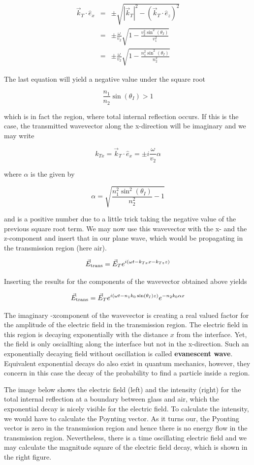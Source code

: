\documentclass[
  a4paper,
]{book}
\begin{document}
\begin{eqnarray}
\vec{k}_T\cdot \hat{e}_x&=&\pm \sqrt{|\vec{k}_T|^2-(\vec{k}_T\cdot \hat{e}_z)^2}\\
&=&\pm \frac{\omega}{v_2}\sqrt{1-\frac{v_2^2\sin^2(\theta_I)}{v_1^2}}\\
&=&\pm \frac{\omega}{v_2}\sqrt{1-\frac{n_1^2\sin^2(\theta_I)}{n_2^2}}
\end{eqnarray}

The last equation will yield a negative value under the square root

\[
\frac{n_1}{n_2}\sin(\theta_I)>1
\]

which is in fact the region, where total internal reflection occurs. If
this is the case, the transmitted wavevector along the x-direction will
be imaginary and we may write

\[
k_{Tx}=\vec{k}_T\cdot \hat{e}_x=\pm i \frac{\omega}{v_2}\alpha
\]

where \(\alpha\) is the given by

\[
\alpha=\sqrt{\frac{n_1^2\sin^2(\theta_I)}{n_2^2}-1}
\]

and is a positive number due to a little trick taking the negative value
of the previous square root term. We may now use this wavevector with
the x- and the z-component and insert that in our plane wave, which
would be propagating in the transmission region (here air).

\[
\vec{E}_{\rm trans}=\vec{E}_T e^{i(\omega t -k_{Tx}x-k_{Tz}z)}
\]

Inserting the results for the components of the wavevector obtained
above yields

\[
\vec{E}_{\rm trans}=\vec{E}_T e^{i(\omega t -n_1 k_0\sin(\theta_I) z)}e^{-n_2k_0 \alpha x}
\]

The imaginary -xcomponent of the wavevector is creating a real valued
factor for the amplitude of the electric field in the transmission
region. The electric field in this region is decaying exponentially with
the distance \(x\) from the interface. Yet, the field is only
osciallting along the interface but not in the x-direction. Such an
exponentially decaying field without oscillation is called
\textbf{evanescent wave}. Equivalent exponential decays do also exist in
quantum mechanics, however, they concern in this case the decay of the
probability to find a particle inside a region.

The image below shows the electric field (left) and the intensity
(right) for the total internal reflection at a boundary between glass
and air, which the exponential decay is nicely visible for the electric
field. To calculate the intensity, we would have to calculate the
Poynting vector. As it turns our, the Pyonting vector is zero in the
transmission region and hence there is no energy flow in the
transmission region. Nevertheless, there is a time oscillating electric
field and we may calculate the magnitude square of the electric field
decay, which is shown in the right figure.
\end{document}

